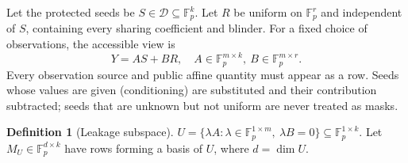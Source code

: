 \documentclass[pdflatex,sn-mathphys-num,twocolumn]{sn-jnl}
\theoremstyle{plain}
\theoremstyle{definition}
\newtheorem{definition}[theorem]{Definition}
\newcommand{\F}{\mathbb{F}}
\begin{document}
Let the protected seeds be $S\in \mathcal D\subseteq\F_p^k$. Let $R$ be uniform on $\F_p^r$ and independent of $S$, containing every sharing coefficient and blinder. For a fixed choice of observations, the accessible view is
\begin{equation}\label{eq:view}
 Y=AS+BR,\quad A\in\F_p^{m\times k},\ B\in\F_p^{m\times r}.
\end{equation}
Every observation source and public affine quantity must appear as a row. Seeds whose values are given (conditioning) are substituted and their contribution subtracted; seeds that are unknown but not uniform are never treated as masks.

\begin{definition}[Leakage subspace]
$U=\{\lambda A:\lambda\in\F_p^{1\times m},\ \lambda B=0\}\subseteq\F_p^{1\times k}$. Let $M_U\in\F_p^{d\times k}$ have rows forming a basis of $U$, where $d=\dim U$.
\end{definition}
\end{document}
